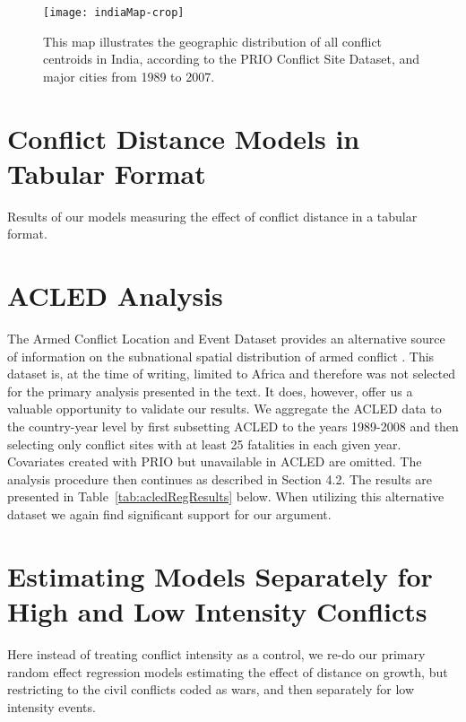 \documentclass[12pt,onesided]{amsart}
\begin{document}
\begin{figure}[ht]
	\centering
	\texttt{[image: indiaMap-crop]}
	\caption{This map illustrates the geographic distribution of all conflict centroids in India, according to the PRIO Conflict Site Dataset, and major cities from 1989 to 2007. }
	\label{fig:indiaMap}
\end{figure}
\FloatBarrier

\clearpage
\section{Conflict Distance Models in Tabular Format}

Results of our models measuring the effect of conflict distance in a tabular format.  



\clearpage
\section{ACLED Analysis}
\label{acled}

The Armed Conflict Location and Event Dataset provides an alternative source of information on the subnational spatial distribution of armed conflict \citep{raleigh:linke:etal:2010}. This dataset is, at the time of writing, limited to Africa and therefore was not selected for the primary analysis presented in the text. It does, however, offer us a valuable opportunity to validate our results. We aggregate the ACLED data to the country-year level by first subsetting ACLED to the years 1989-2008 and then selecting only conflict sites with at least 25 fatalities in each given year. Covariates created with PRIO but unavailable in ACLED are omitted. The analysis procedure then continues as described in Section 4.2. The results are presented in Table~\ref{tab:acledRegResults} below. When utilizing this alternative dataset we again find significant support for our argument.


\FloatBarrier

\clearpage
\section{Estimating Models Separately for High and Low Intensity Conflicts}

Here instead of treating conflict intensity as a control, we re-do our primary random effect regression models estimating the effect of distance on growth, but restricting to the civil conflicts coded as wars, and then separately for low intensity events. 


\FloatBarrier
\clearpage

\newpage

%  


\newpage
\end{document}
